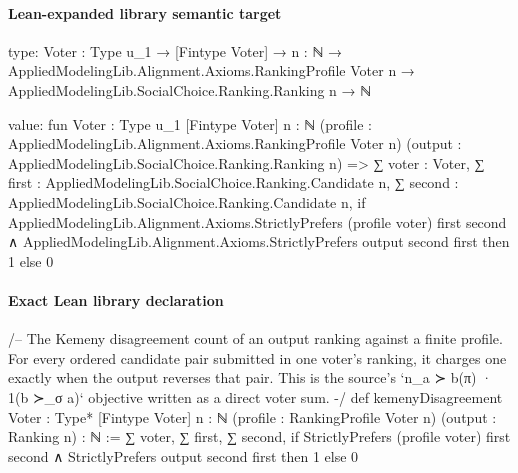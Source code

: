 \documentclass[10pt]{article}
\begin{document}
\paragraph{Lean-expanded library semantic target}
\begin{ReviewVerbatim}
type:
{Voter : Type u_1} →
  [Fintype Voter] →
    {n : ℕ} →
      AppliedModelingLib.Alignment.Axioms.RankingProfile Voter n → AppliedModelingLib.SocialChoice.Ranking.Ranking n → ℕ

value:
fun {Voter : Type u_1} [Fintype Voter] {n : ℕ} (profile : AppliedModelingLib.Alignment.Axioms.RankingProfile Voter n)
    (output : AppliedModelingLib.SocialChoice.Ranking.Ranking n) =>
  ∑ voter : Voter,
    ∑ first : AppliedModelingLib.SocialChoice.Ranking.Candidate n,
      ∑ second : AppliedModelingLib.SocialChoice.Ranking.Candidate n,
        if
            AppliedModelingLib.Alignment.Axioms.StrictlyPrefers (profile voter) first second ∧
              AppliedModelingLib.Alignment.Axioms.StrictlyPrefers output second first then
          1
        else 0
\end{ReviewVerbatim}

\paragraph{Exact Lean library declaration}
\begin{ReviewVerbatim}
/--
The Kemeny disagreement count of an output ranking against a finite profile.
For every ordered candidate pair submitted in one voter's ranking, it charges
one exactly when the output reverses that pair.  This is the source's
`n_{a ≻ b}(π) · 1(b ≻_σ a)` objective written as a direct voter sum.
-/
def kemenyDisagreement {Voter : Type*} [Fintype Voter] {n : ℕ}
    (profile : RankingProfile Voter n) (output : Ranking n) : ℕ :=
  ∑ voter, ∑ first, ∑ second,
    if StrictlyPrefers (profile voter) first second ∧ StrictlyPrefers output second first then 1
    else 0
\end{ReviewVerbatim}
\end{document}
